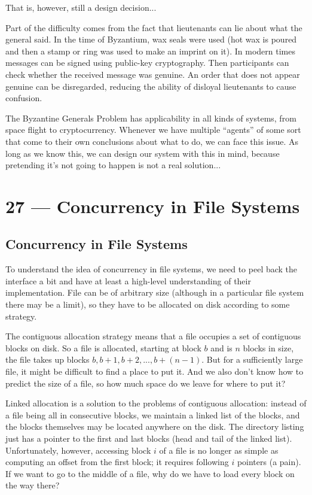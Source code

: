 \documentclass[a4paper]{report}
\begin{document}
That is, however, still a design decision...

Part of the difficulty comes from the fact that lieutenants can lie about what the general said.  In the time of Byzantium, wax seals were used (hot wax is poured and then a stamp or ring was used to make an imprint on it). In modern times messages can be signed using public-key cryptography. Then participants can check whether the received message was genuine. An order that does not appear genuine can be disregarded, reducing the ability of disloyal lieutenants to cause confusion.

The Byzantine Generals Problem has applicability in all kinds of systems, from space flight to cryptocurrency. Whenever we have multiple ``agents'' of some sort that come to their own conclusions about what to do, we can face this issue. As long as we know this, we can design our system with this in mind, because pretending it's not going to happen is not a real solution...








\chapter*{27 --- Concurrency in File Systems}


\section*{Concurrency in File Systems}

To understand the idea of concurrency in file systems, we need to peel back the interface a bit and have at least a high-level understanding of their implementation. File can be of arbitrary size (although in a particular file system there may be a limit), so they have to be allocated on disk according to some strategy.

The contiguous allocation strategy means that a file occupies a set of contiguous blocks on disk. So a file is allocated, starting at block $b$ and is $n$ blocks in size, the file takes up blocks $b, b+1, b+2, ..., b+(n-1)$. But for a sufficiently large file, it might be difficult to find a place to put it. And we also don't know how to predict the size of a file, so how much space do we leave for where to put it?

Linked allocation is a solution to the problems of contiguous allocation: instead of a file being all in consecutive blocks, we maintain a linked list of the blocks, and the blocks themselves may be located anywhere on the disk. The directory listing just has a pointer to the first and last blocks (head and tail of the linked list). Unfortunately, however, accessing block $i$ of a file is no longer as simple as computing an offset from the first block; it requires following $i$ pointers (a pain). If we want to go to the middle of a file, why do we have to load every block on the way there?
\end{document}
